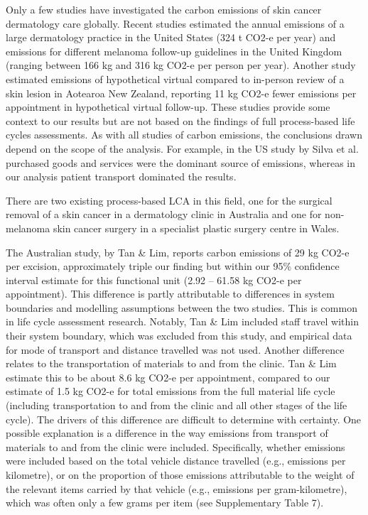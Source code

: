\begin{refsection}
Only a few studies have investigated the carbon emissions of skin cancer dermatology care globally. Recent studies estimated the annual emissions of a large dermatology practice in the United States (324 t CO2-e per year)\cite{silva_carbon_2025} and emissions for different melanoma follow-up guidelines in the United Kingdom (ranging between 166 kg and 316 kg CO2-e per person per year).\cite{grover_relative_2024} Another study estimated emissions of hypothetical virtual compared to in-person review of a skin lesion in Aotearoa New Zealand, reporting 11 kg CO2-e fewer emissions per appointment in hypothetical virtual follow-up.\cite{jones_virtual_2024} These studies provide some context to our results but are not based on the findings of full process-based life cycles assessments. As with all studies of carbon emissions, the conclusions drawn depend on the scope of the analysis. For example, in the US study by Silva et al. purchased goods and services were the dominant source of emissions,\cite{silva_carbon_2025} whereas in our analysis patient transport dominated the results.

There are two existing process-based LCA in this field, one for the surgical removal of a skin cancer in a dermatology clinic in Australia and one for non-melanoma skin cancer surgery in a specialist plastic surgery centre in Wales.\cite{tan_carbon_2021, ang_carbon_2024} 

The Australian study, by Tan \& Lim, reports carbon emissions of 29 kg CO2-e per excision, approximately triple our finding but within our 95\% confidence interval estimate for this functional unit (2.92 – 61.58 kg CO2-e per appointment). This difference is partly attributable to differences in system boundaries and modelling assumptions between the two studies. This is common in life cycle assessment research. Notably, Tan \& Lim included staff travel within their system boundary, which was excluded from this study, and empirical data for mode of transport and distance travelled was not used. Another difference relates to the transportation of materials to and from the clinic. Tan \& Lim estimate this to be about 8.6 kg CO2-e per appointment, compared to our estimate of 1.5 kg CO2-e for total emissions from the full material life cycle (including transportation to and from the clinic and all other stages of the life cycle). The drivers of this difference are difficult to determine with certainty. One possible explanation is a difference in the way emissions from transport of materials to and from the clinic were included. Specifically, whether emissions were included based on the total vehicle distance travelled (e.g., emissions per kilometre), or on the proportion of those emissions attributable to the weight of the relevant items carried by that vehicle (e.g., emissions per gram-kilometre), which was often only a few grams per item (see Supplementary Table 7).


\end{refsection}
